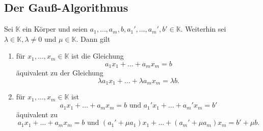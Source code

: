 \documentclass[a4paper,12pt]{article}
\numberwithin{equation}{section}
\begin{document}
\subsection{Der Gauß-Algorithmus}
Sei $\mathbb{K}$ ein Körper und seien $a_1,\hdots ,a_m,b,a_1',\hdots ,a_m',b' \in \mathbb{K}$. Weiterhin sei $\lambda  \in \mathbb{K},\lambda \neq 0$ und $\mu  \in \mathbb{K}$. Dann gilt
\begin{enumerate}[label=(\alph*)]
        \item für $x_1,\hdots ,x_m \in \mathbb{K}$ ist die Gleichung 
                \[ 
                        a_1x_1+\hdots +a_mx_m=b
                \] 
                äquivalent zu der Gleichung
                \[ 
                        \lambda a_1x_1+\hdots +\lambda a_mx_m=\lambda b
                .\] 
        \item für $x_1,\hdots ,x_m \in \mathbb{K}$ ist 
                \[ 
                        a_1x_1+\hdots +a_mx_m=b\text{ und }a_1'x_1+\hdots +a_m'x_m=b'
                \] 
                äquivalent zu
                \[ 
                        a_1x_1+\hdots +a_mx_m=b\text{ und }\left(a_1'+\mu a_1\right)x_1+\hdots +\left(a_m'+\mu a_m\right)x_m=b'+\mu b
                .\] 
\end{enumerate}
\end{document}
